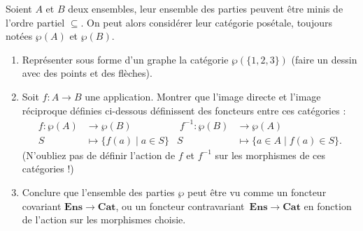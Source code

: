 \documentclass{../../td}
\begin{document}
  \begin{slshape}
    \color{deepblue}
    Soient $A$ et $B$ deux ensembles, leur ensemble des parties peuvent être minis de l'ordre partiel $\subseteq$. On peut alors considérer leur catégorie posétale, toujours notées $\wp(A)$ et $\wp(B)$.
    \begin{enumerate}
      \item Représenter sous forme d'un graphe la catégorie $\wp(\{1,2,3\})$ (faire un dessin avec des points et des flèches).
      \item Soit $f : A \to B$ une application.
        Montrer que l'image directe et l'image réciproque définies ci-dessous définissent des foncteurs entre ces catégories :
        \begin{align*}
          f: \wp(A) &\longrightarrow \wp(B) &\; f^{-1} : \wp(B) &\longrightarrow \wp(A) \\
          S&\longmapsto \{f(a)  \mid a \in S\}  & S &\longmapsto \{a \in A  \mid f(a) \in S\}
        .\end{align*}
        (N'oubliez pas de définir l'action de $f$ et $f^{-1}$ sur les morphismes de ces catégories !)
      \item Conclure que l'ensemble des parties $\wp$ peut être vu comme un foncteur covariant $\mathbf{Ens}\to \mathbf{Cat}$, ou un foncteur contravariant~$\mathbf{Ens} \to \mathbf{Cat}$ en fonction de l'action sur les morphismes choisie.
    \end{enumerate}
  \end{slshape}
\end{document}
